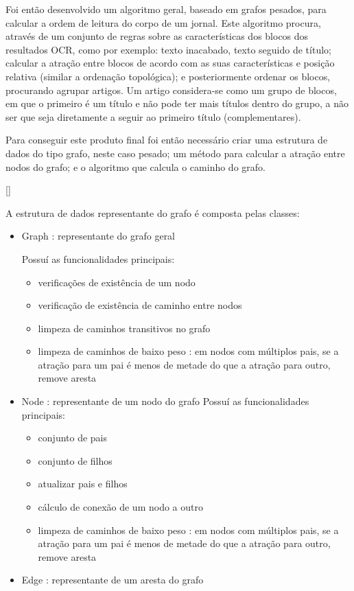Foi então desenvolvido um algoritmo geral, baseado em grafos pesados, para calcular a ordem de leitura do corpo de um jornal. Este algoritmo procura, através de um conjunto de regras sobre as características dos blocos dos resultados OCR, como por exemplo: texto inacabado, texto seguido de título; calcular a atração entre blocos de acordo com as suas características e posição relativa (similar a ordenação topológica); e posteriormente ordenar os blocos, procurando agrupar artigos. Um artigo considera-se como um grupo de blocos, em que o primeiro é um título e não pode ter mais títulos dentro do grupo, a não ser que seja diretamente a seguir ao primeiro título (complementares).

Para conseguir este produto final foi então necessário criar uma estrutura de dados do tipo grafo, neste caso pesado; um método para calcular a atração entre nodos do grafo; e o algoritmo que calcula o caminho do grafo.

[\normalsize]

A estrutura de dados representante do grafo é composta pelas classes:

\begin{itemize}\setlength\itemsep{-0.3em}
	\vspace{-0.5em}
	\item Graph : representante do grafo geral
	
		Possuí as funcionalidades principais:
		\begin{itemize}\setlength\itemsep{-0.8em}
			\item verificações de existência de um nodo
			\item verificação de existência de caminho entre nodos
			\item limpeza de caminhos transitivos no grafo
			\item limpeza de caminhos de baixo peso : em nodos com múltiplos pais, se a atração para um pai é menos de metade do que a atração para outro, remove aresta
		\end{itemize}
	\item Node : representante de um nodo do grafo
		Possuí as funcionalidades principais:
		\begin{itemize}\setlength\itemsep{-0.8em}
			\item conjunto de pais
			\item conjunto de filhos
			\item atualizar pais e filhos
			\item cálculo de conexão de um nodo a outro
			\item limpeza de caminhos de baixo peso : em nodos com múltiplos pais, se a atração para um pai é menos de metade do que a atração para outro, remove aresta
		\end{itemize}
	\item Edge : representante de um aresta do grafo
\end{itemize}



